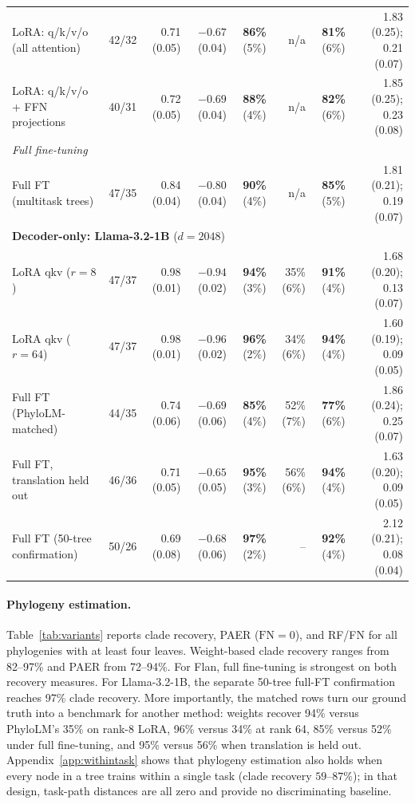 \documentclass{article}
\theoremstyle{definition}
\theoremstyle{plain}
\begin{document}
\begin{table}[t]
\begin{center}
\begin{tabular}{lrrrrrrr}
\quad LoRA: q/k/v/o (all attention)     & 42/32 & 0.71 (0.05) & $-0.67$ (0.04) & \textbf{86\%} (5\%) & n/a & \textbf{81\%} (6\%) & 1.83 (0.25); 0.21 (0.07) \\
\quad LoRA: q/k/v/o + FFN projections  & 40/31 & 0.72 (0.05) & $-0.69$ (0.04) & \textbf{88\%} (4\%) & n/a & \textbf{82\%} (6\%) & 1.85 (0.25); 0.23 (0.08) \\
\multicolumn{8}{l}{\quad\textit{Full fine-tuning}} \\
\quad Full FT (multitask trees)         & 47/35 & 0.84 (0.04) & $-0.80$ (0.04) & \textbf{90\%} (4\%) & n/a & \textbf{85\%} (5\%) & 1.81 (0.21); 0.19 (0.07) \\
\midrule
\multicolumn{8}{l}{\textbf{Decoder-only: Llama-3.2-1B} ($d=2048$)} \\
\quad LoRA qkv ($r{=}8$)                 & 47/37 & 0.98 (0.01) & $-0.94$ (0.02) & \textbf{94\%} (3\%) & 35\% (6\%) & \textbf{91\%} (4\%) & 1.68 (0.20); 0.13 (0.07) \\
\quad LoRA qkv ($r{=}64$)                & 47/37 & 0.98 (0.01) & $-0.96$ (0.02) & \textbf{96\%} (2\%) & 34\% (6\%) & \textbf{94\%} (4\%) & 1.60 (0.19); 0.09 (0.05) \\
\quad Full FT (PhyloLM-matched)          & 44/35 & 0.74 (0.06) & $-0.69$ (0.06) & \textbf{85\%} (4\%) & 52\% (7\%) & \textbf{77\%} (6\%) & 1.86 (0.24); 0.25 (0.07) \\
\quad Full FT, translation held out      & 46/36 & 0.71 (0.05) & $-0.65$ (0.05) & \textbf{95\%} (3\%) & 56\% (6\%) & \textbf{94\%} (4\%) & 1.63 (0.20); 0.09 (0.05) \\
\quad Full FT (50-tree confirmation)     & 50/26 & 0.69 (0.08) & $-0.68$ (0.06) & \textbf{97\%} (2\%) & -- & \textbf{92\%} (4\%) & 2.12 (0.21); 0.08 (0.04) \\
\bottomrule
\end{tabular}
\end{center}
\end{table}



\paragraph{Phylogeny estimation.}
\label{sec:results:weighttree}
Table~\ref{tab:variants} reports clade recovery, PAER ($\mathrm{FN}=0$), and RF/FN for all phylogenies with at least four leaves. Weight-based clade recovery ranges from 82--97\% and PAER from 72--94\%. For Flan, full fine-tuning is strongest on both recovery measures. For Llama-3.2-1B, the separate 50-tree full-FT confirmation reaches 97\% clade recovery. More importantly, the matched rows turn our ground truth into a benchmark for another method: weights recover 94\% versus PhyloLM's 35\% on rank-8 LoRA, 96\% versus 34\% at rank 64, 85\% versus 52\% under full fine-tuning, and 95\% versus 56\% when translation is held out. Appendix~\ref{app:withintask} shows that phylogeny estimation also holds when every node in a tree trains within a single task (clade recovery $59$--$87\%$); in that design, task-path distances are all zero and provide no discriminating baseline.
\end{document}
